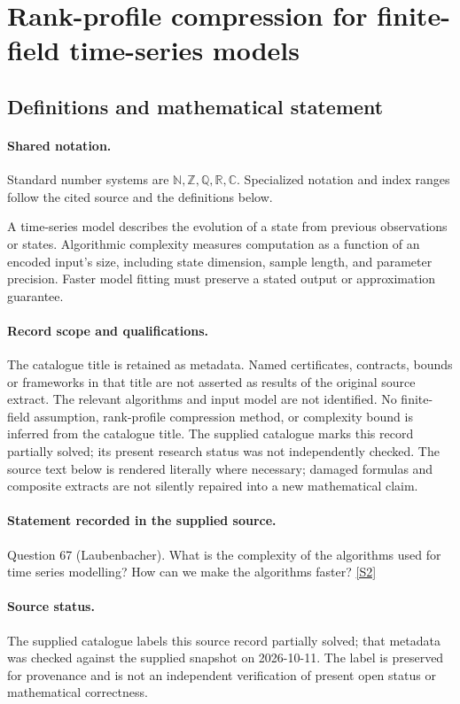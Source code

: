 \documentclass[11pt]{article}
\newcommand{\sref}[2]{\hyperlink{source:#1:#2}{[S#2]}}
\begin{document}
\section{Rank-profile compression for finite-field time-series models}\label{statement}

\subsection{Definitions and mathematical statement}

\paragraph{Shared notation.}Standard number systems are $\mathbb N,\mathbb Z,\mathbb Q,\mathbb R,\mathbb C$. Specialized notation and index ranges follow the cited source and the definitions below.


A time-series model describes the evolution of a state from previous observations or states. Algorithmic complexity measures computation as a function of an encoded input's size, including state dimension, sample length, and parameter precision. Faster model fitting must preserve a stated output or approximation guarantee.
\paragraph{Record scope and qualifications.}
The catalogue title is retained as metadata. Named certificates, contracts, bounds or frameworks in that title are not asserted as results of the original source extract.
The relevant algorithms and input model are not identified. No finite-field assumption, rank-profile compression method, or complexity bound is inferred from the catalogue title. The supplied catalogue marks this record partially solved; its present research status was not independently checked.
The source text below is rendered literally where necessary; damaged formulas and composite extracts are not silently repaired into a new mathematical claim.
\paragraph{Statement recorded in the supplied source.}
Question 67 (Laubenbacher). What is the complexity of the algorithms used for time series modelling? How can we make the algorithms faster? \sref{statement}{2}
\paragraph{Source status.}
The supplied catalogue labels this source record partially solved; that metadata was checked against the supplied snapshot on 2026-10-11. The label is preserved for provenance and is not an independent verification of present open status or mathematical correctness.
\end{document}
